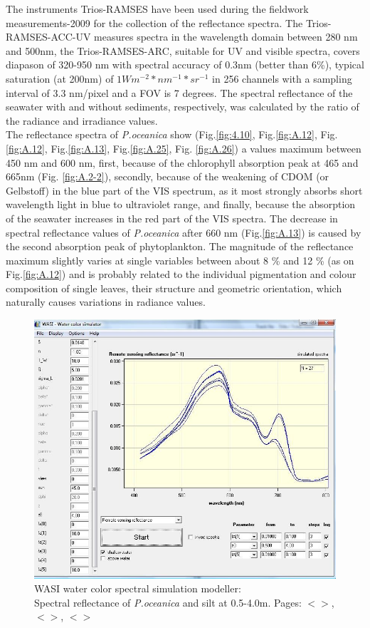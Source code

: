 \documentclass[11pt]{article}
\begin{document}
The instruments \ac{Trios-RAMSES} have been used during the fieldwork measurements-2009 for the collection of the reflectance spectra. The \ac{Trios-RAMSES}-ACC-\ac{UV} measures spectra in the wavelength domain between 280 nm and 500nm, the \ac{Trios-RAMSES}-ARC, suitable for UV and visible spectra, covers diapason of 320-950 nm with spectral accuracy of 0.3nm (better than 6\%), typical saturation (at 200nm) of  $1Wm^{-2}*nm^{-1}*sr^{-1}$ in 256 channels with a sampling interval of 3.3 nm/pixel and a \ac{FOV} is 7 degrees. The spectral reflectance of the seawater with and without sediments, respectively, was calculated by the ratio of the radiance and irradiance values. \\
The reflectance spectra of \textit{P.oceanica} show (Fig.\ref{fig:4.10}, Fig.\ref{fig:A.12}, Fig. \ref{fig:A.12}, Fig.\ref{fig:A.13}, Fig.\ref{fig:A.25}, Fig. \ref{fig:A.26}) a values maximum between 450 nm and 600 nm, first, because of the chlorophyll absorption peak at 465 and 665nm (Fig. \ref{fig:A.2-2})\label{chlorophyll}, secondly, because of the weakening of \ac{CDOM} (or Gelbstoff) in the blue part of the \ac{VIS} spectrum, as it most strongly absorbs short wavelength light in blue to ultraviolet range, and finally, because the absorption of the seawater increases in the red part of the \ac{VIS} spectra. The decrease in spectral reflectance values of \textit{P.oceanica} after 660 nm (Fig.\ref{fig:A.13}) is caused by the second absorption peak of phytoplankton. The magnitude of the reflectance maximum slightly varies at single variables between about 8 \% and 12 \% (as on Fig.\ref{fig:A.12}) and is probably related to the individual pigmentation and colour composition of single leaves, their structure and geometric orientation, which naturally causes variations in radiance values. 

\begin{figure}[h]
	\centering
	\includegraphics[scale=0.30]{Fig-30.jpg}
	\caption{\ac{WASI} water color spectral simulation modeller: \\ Spectral reflectance of \textit{P.oceanica} and silt at 0.5-4.0m. Pages: $<$\pageref{page-35}$>$, $<$\pageref{page-31}$>$, $<$\pageref{GUI}$>$}
	\label{fig:4.7}
\end{figure}
\end{document}
